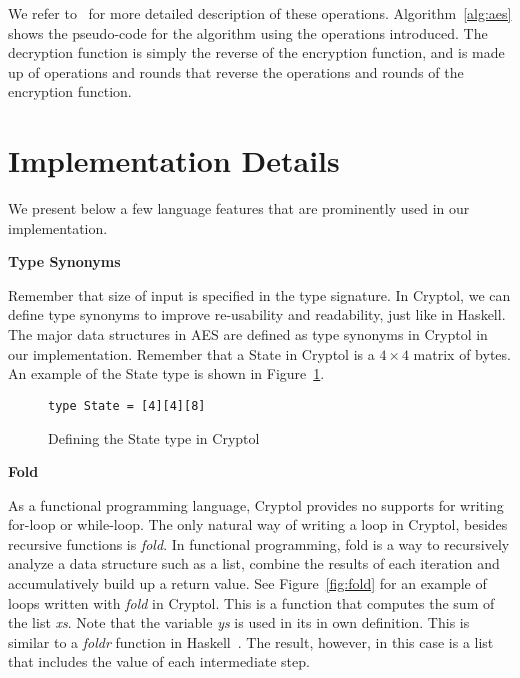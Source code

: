 \documentclass[a4paper, notitlepage]{report}
\renewcommand{\paragraph}[1]{\vspace*{1em}\noindent\textbf{#1}\hspace*{1em}}
\begin{document}
We refer to~\cite{standard2001announcing} for more detailed description of these
operations. Algorithm~\ref{alg:aes} shows the pseudo-code for the algorithm using
the operations
introduced.
The decryption function is simply the reverse of the encryption function, and
is made up of operations and rounds that reverse the operations and rounds of
the encryption function.


\section{Implementation Details}


We present below a few language features that are prominently used in our
implementation.

\paragraph{Type Synonyms}

Remember that size of input is specified in the type signature.
In Cryptol, we can define type synonyms to improve re-usability and readability,
just like in Haskell.
The major data structures in AES are defined as type synonyms in Cryptol in our
implementation.
Remember that a State in Cryptol is a $4 \times 4$ matrix of bytes. An example
of the State type is shown in Figure~\ref{fig:typedef}. 

\begin{figure}
  \begin{lstlisting}[frame=single]
    type State = [4][4][8]
  \end{lstlisting}
  \caption{Defining the State type in Cryptol}
  \label{fig:typedef}
\end{figure}


\paragraph{Fold}

As a functional programming language, Cryptol provides no supports for writing
for-loop or
while-loop. The only natural way of writing a loop in Cryptol, besides recursive
functions is \emph{fold}.
In functional programming, fold is a way to recursively analyze a data structure
such as a list, combine the results of each iteration and accumulatively build up
a return value.
See Figure~\ref{fig:fold} for an example of loops written with \emph{fold} in
Cryptol.
This is a function that computes the sum of the list \emph{xs}.
Note that the variable \emph{ys} is used in its in own definition.
This is similar to a \emph{foldr} function in Haskell~\cite{lipovaca2011learn}.
The result, however, in this case is a list that includes the value of each
intermediate step.
\end{document}
